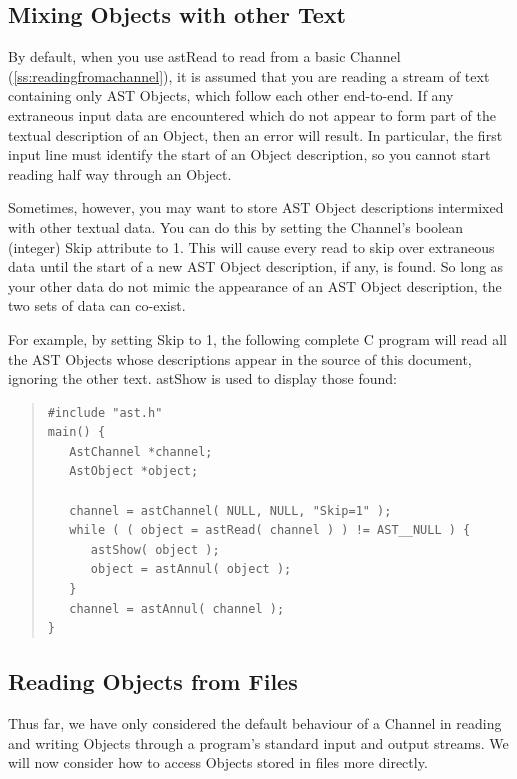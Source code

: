 \documentclass[twoside,11pt]{article}
\newcommand{\htmlref}[2]{#1}
\newcommand{\secref}[1]{\S\ref{#1}}
\renewcommand{\secref}[1]{\ref{#1}}
\begin{document}
\subsection{\label{ss:mixingchanneltext}Mixing Objects with other Text}

By default, when you use \htmlref{astRead}{astRead} to read from a basic \htmlref{Channel}{Channel}
(\secref{ss:readingfromachannel}), it is assumed that you are reading a
stream of text containing only AST Objects, which follow each other
end-to-end. If any extraneous input data are encountered which do not
appear to form part of the textual description of an \htmlref{Object}{Object}, then an
error will result. In particular, the first input line must identify
the start of an Object description, so you cannot start reading half
way through an Object.

Sometimes, however, you may want to store AST Object descriptions
intermixed with other textual data. You can do this by setting the
Channel's boolean (integer) \htmlref{Skip}{Skip} attribute to 1. This will cause every
read to skip over extraneous data until the start of a new AST Object
description, if any, is found. So long as your other data do not mimic
the appearance of an AST Object description, the two sets of data can
co-exist.

For example, by setting Skip to 1, the following complete C program
will read all the AST Objects whose descriptions appear in the source
of this document, ignoring the other text. \htmlref{astShow}{astShow} is used to display
those found:

\begin{quote}
\small
\begin{verbatim}
#include "ast.h"
main() {
   AstChannel *channel;
   AstObject *object;

   channel = astChannel( NULL, NULL, "Skip=1" );
   while ( ( object = astRead( channel ) ) != AST__NULL ) {
      astShow( object );
      object = astAnnul( object );
   }
   channel = astAnnul( channel );
}
\end{verbatim}
\normalsize
\end{quote}

\subsection{\label{ss:channelsource}Reading Objects from Files}

Thus far, we have only considered the default behaviour of a \htmlref{Channel}{Channel}
in reading and writing Objects through a program's standard input and
output streams. We will now consider how to access Objects stored in
files more directly.
\end{document}
